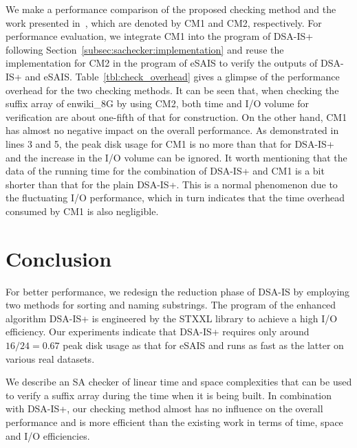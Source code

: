 \documentclass[10pt,journal,compsoc]{IEEEtran}
\begin{document}
We make a performance comparison of the proposed checking method and the work presented in~\cite{Karkkainen2003}, which are denoted by CM1 and CM2, respectively. For performance evaluation, we integrate CM1 into the program of DSA-IS+ following Section~\ref{subsec:sachecker:implementation} and reuse the implementation for CM2 in the program of eSAIS to verify the outputs of DSA-IS+ and eSAIS. Table~\ref{tbl:check_overhead} gives a glimpse of the performance overhead for the two checking methods. It can be seen that, when checking the suffix array of enwiki\_8G by using CM2, both time and I/O volume for verification are about one-fifth of that for construction. On the other hand, CM1 has almost no negative impact on the overall performance. As demonstrated in lines 3 and 5, the peak disk usage for CM1 is no more than that for DSA-IS+ and the increase in the I/O volume can be ignored. It worth mentioning that the data of the running time for the combination of DSA-IS+ and CM1 is a bit shorter than that for the plain DSA-IS+. This is a normal phenomenon due to the fluctuating I/O performance, which in turn indicates that the time overhead consumed by CM1 is also negligible.


	

\section{Conclusion} \label{sec:conclusion}

For better performance, we redesign the reduction phase of DSA-IS by employing two methods for sorting and naming substrings. The program of the enhanced algorithm DSA-IS+ is engineered by the STXXL library to achieve a high I/O efficiency. Our experiments indicate that DSA-IS+ requires only around $16/24=0.67$ peak disk usage as that for eSAIS and runs as fast as the latter on various real datasets.

We describe an SA checker of linear time and space complexities that can be used to verify a suffix array during the time when it is being built. In combination with DSA-IS+, our checking method almost has no influence on the overall performance and is more efficient than the existing work in terms of time, space and I/O efficiencies.



	
\end{document}
